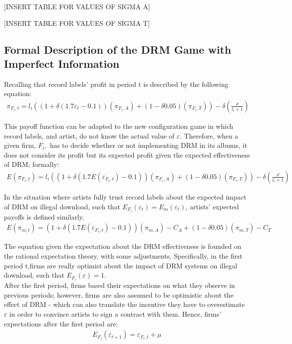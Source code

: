 \documentclass[a4paper,12pt]{article}
\numberwithin{equation}{section}
\begin{document}
{[}INSERT TABLE FOR VALUES OF SIGMA A{]}

{[}INSERT TABLE FOR VALUES OF SIGMA T{]}

\pagebreak

\subsection{Formal Description of the DRM Game with\\
Imperfect Information}

Recalling that record labels' profit in period t is described by the
following equation:
\begin{eqnarray*}
\pi_{F_{i},t}=l_{i}((1+\delta(1.7\varepsilon_{t}-0.1))(\pi_{F_{i},A})+(1-\delta0.05)(\pi_{F_{i},T}))-\delta(\frac{\rho}{l_{i}+1})
\end{eqnarray*}

This payoff function can be adapted to the new configuration game
in which record labels, and artist, do not know the actual value of
$\varepsilon$. Therefore, when a given firm, $F_{i},$ has to decide
whether or not implementing DRM in its albums, it does not consider
its profit but its expected profit given the expected effectiveness
of DRM; formally:
\begin{eqnarray*}
E(\pi_{F_{i},t})=l_{i}((1+\delta(1.7E(\varepsilon_{F_{i},t})-0.1))(\pi_{F_{i},A})+(1-\delta0.05)(\pi_{F_{i},T}))-\delta(\frac{\rho}{l_{i}+1})
\end{eqnarray*}

In the situation where artists fully trust record labels about the
expected impact of DRM on illegal download, such that $E_{F_{i}}(\varepsilon_{t})=E_{m}(\varepsilon_{t})$, artists' expected payoffs is defined similarly.
\begin{eqnarray*}
E(\pi_{m,t})=(1+\delta(1.7E(\varepsilon_{F_{i},t})-0.1))(\pi_{m,A})-C_{A}+(1-\delta0.05)(\pi_{m,T})-C_{T}
\end{eqnarray*}

The equation given the expectation about the DRM effectiveness is
founded on the rational expectation theory, with some adjustments.
Specifically, in the first period t,firms are really optimist about
the impact of DRM systems on illegal download, such that $E_{F_i}(\varepsilon)=1$.\\

After the first period, firms based their expectations on what they
observe in previous periods; however, firms are also assumed to be
optimistic about the effect of DRM - which can also translate the incentive
they have to overestimate $\varepsilon$ in order to convince artists
to sign a contract with them. Hence, firms' expectations after the
first period are:
\begin{eqnarray*}
E_{F_{i}}(\varepsilon_{t+1})=\varepsilon_{F_{i},t} + \mu
\end{eqnarray*}
\end{document}
